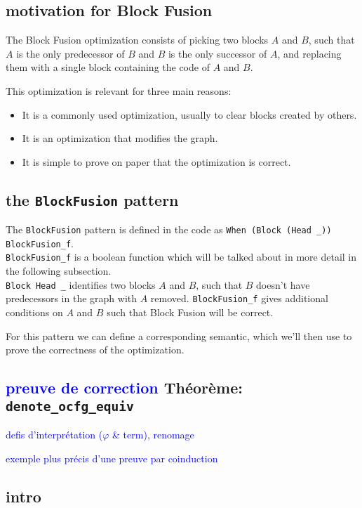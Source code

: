\documentclass[11pt]{article}
\newcommand{\leon}[1]{\textcolor{blue}{#1}}
\begin{document}
\subsection{motivation for Block Fusion}

The Block Fusion optimization consists of picking two blocks $A$ and $B$,
such that $A$ is the only predecessor of $B$ and $B$ is the only successor of $A$,
and replacing them with a single block containing the code of $A$ and $B$.

This optimization is relevant for three main reasons:\begin{itemize}
  \item It is a commonly used optimization, usually to clear blocks created by others.
  \item It is an optimization that modifies the graph.
  \item It is simple to prove on paper that the optimization is correct.
\end{itemize}

\subsection{the \texttt{BlockFusion} pattern}

The \texttt{BlockFusion} pattern is defined in the code as \texttt{When (Block (Head \_)) BlockFusion\_f}.\\
\texttt{BlockFusion\_f} is a boolean function which will be talked about in more detail in the following subsection.\\
\texttt{Block Head \_} identifies two blocks $A$ and $B$, such that $B$ doesn't have predecessors in the graph with $A$ removed. \texttt{BlockFusion\_f} gives additional conditions on $A$ and $B$ such that Block Fusion will be correct.

For this pattern we can define a corresponding semantic, which we'll then use to prove the correctness of the optimization.

\subsection{\leon{preuve de correction} Théorème: \texttt{denote\_ocfg\_equiv}}
\label{sec:equiv}

\leon{defis d'interprétation ($\varphi$ \& term), renomage}

\leon{exemple plus précis d'une preuve par coinduction}

\subsection*{intro}
\end{document}
